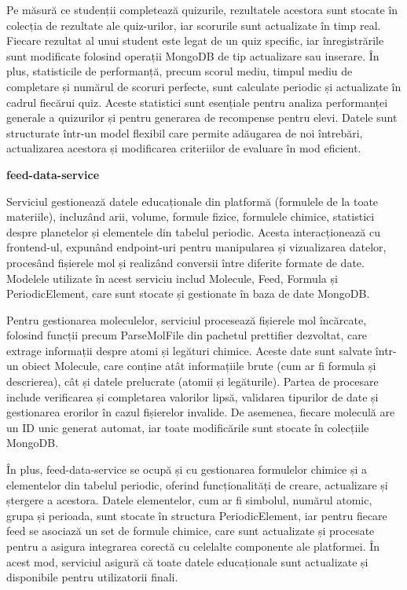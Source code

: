 Pe măsură ce studenții completează quizurile, rezultatele acestora sunt 
stocate în colecția de rezultate ale quiz-urilor, iar scorurile sunt actualizate
în timp real. Fiecare rezultat al unui student este legat de un quiz specific, 
iar înregistrările sunt modificate folosind operații MongoDB de tip actualizare sau inserare.
În plus, statisticile de performanță, precum scorul mediu,
timpul mediu de completare și numărul de scoruri perfecte, sunt calculate periodic 
și actualizate în cadrul fiecărui quiz. Aceste statistici sunt esențiale pentru
analiza performanței generale a quizurilor și pentru generarea de recompense pentru elevi.
Datele sunt structurate într-un model flexibil care permite adăugarea
de noi întrebări, actualizarea acestora și modificarea criteriilor de evaluare în mod eficient.

\textbf{feed-data-service}

Serviciul gestionează datele educaționale din platformă (formulele de la toate materiile),
incluzând arii, volume, formule fizice, formulele chimice, statistici despre planetelor
și elementele din tabelul periodic. Acesta
interacționează cu frontend-ul, expunând endpoint-uri pentru manipularea și
vizualizarea datelor, procesând fișierele mol și realizând
conversii între diferite formate de date. Modelele utilizate în acest serviciu
includ Molecule, Feed, Formula și PeriodicElement,
care sunt stocate și gestionate în baza de date MongoDB. 

Pentru gestionarea moleculelor, serviciul procesează fișierele mol încărcate, 
folosind funcții precum ParseMolFile din pachetul prettifier dezvoltat,
care extrage informații despre atomi și legături chimice. Aceste date sunt
salvate într-un obiect Molecule, care conține atât informațiile 
brute (cum ar fi formula și descrierea), cât și datele prelucrate (atomii
și legăturile). Partea de procesare include verificarea și completarea valorilor
lipsă, validarea tipurilor de date și gestionarea erorilor în cazul fișierelor
invalide. De asemenea, fiecare moleculă are un ID unic generat automat, iar
toate modificările sunt stocate în colecțiile MongoDB.

În plus, feed-data-service se ocupă și cu gestionarea formulelor 
chimice și a elementelor din tabelul periodic, oferind funcționalități 
de creare, actualizare și ștergere a acestora. Datele elementelor, cum 
ar fi simbolul, numărul atomic, grupa și perioada, sunt stocate în structura 
PeriodicElement, iar pentru fiecare feed se asociază un set de 
formule chimice, care sunt actualizate și procesate pentru a asigura 
integrarea corectă cu celelalte componente ale platformei. În acest mod,
serviciul asigură că toate datele educaționale sunt actualizate și
disponibile pentru utilizatorii finali.

